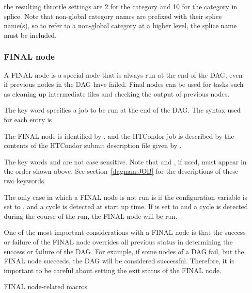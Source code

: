 the resulting throttle settings are 2 for the  category
and 10 for the  category in splice.
Note that non-global category names are
prefixed with their splice name(s), so to refer to a non-global category 
at a higher level, the splice name must be included.


\subsubsection{\label{sec:DAGFinalNode}FINAL node}

A FINAL node is a special node that is always run at the end of the DAG,
even if previous nodes in the DAG have failed.  Final nodes can be used
for tasks such as cleaning up intermediate files and checking the output
of previous nodes.

The  key word specifies a job to be run at the end of
the DAG.  The syntax used for each  entry is

  
 

The FINAL node is identified by , and the HTCondor job
is described by the contents of the HTCondor submit description file
given by .

The key words  and  are not case sensitive.
Note that  and , if used, must appear
in the order shown above.
See section~\ref{dagman:JOB} for the descriptions of these two keywords.

The only case in which a FINAL node is not run
is if the configuration variable  
is set to ,
and a cycle is detected at start up time.
If  is set to  and
a cycle is detected during the course of the run, 
the FINAL node will be run.

One of the most important considerations with a FINAL node is that the
success or failure of the FINAL node overrides all previous status
in determining the success or failure of the DAG.
For example, if some nodes of a DAG fail,
but the FINAL node succeeds, the DAG will be considered successful.
Therefore, it is important
to be careful about setting the exit status of the FINAL node.

\begin{description}
\item[FINAL node-related macros]
\end{description}

